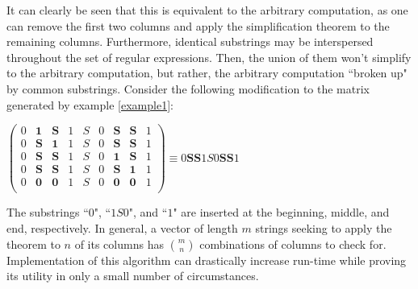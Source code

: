 \documentclass[runningheads]{llncs}
\begin{document}
It can clearly be seen that this is equivalent to the arbitrary computation, as one can remove the first two columns and apply the simplification theorem to the remaining columns.
Furthermore, identical substrings may be interspersed throughout the set of regular expressions. Then, the union of them won't simplify to the arbitrary computation, but rather, the arbitrary computation ``broken up" by common substrings. Consider the following modification to the matrix generated by example \ref{example1}:
\begin{center}
$
\begin{pmatrix}
  0 & \mathbf{1} & \mathbf{S} & 1 & S & 0 & \mathbf{S} & \mathbf{S} & 1\\
  0 & \mathbf{S} & \mathbf{1} & 1 & S & 0 & \mathbf{S} & \mathbf{S} & 1\\
  0 & \mathbf{S} & \mathbf{S} & 1 & S & 0 & \mathbf{1} & \mathbf{S} & 1\\
  0 & \mathbf{S} & \mathbf{S} & 1 & S & 0 & \mathbf{S} & \mathbf{1} & 1\\
  0 & \mathbf{0} & \mathbf{0} & 1 & S & 0 & \mathbf{0} & \mathbf{0} & 1\\
    \end{pmatrix} \equiv  0\mathbf{S}\mathbf{S}1S0  \mathbf{S}\mathbf{S}1
$
\end{center}
The substrings ``$0$", ``$1S0$", and ``$1$" are inserted at the beginning, middle, and end, respectively. In general, a vector of length $m$ strings seeking to apply the theorem to $n$ of its columns has $m \choose n$ combinations of columns to check for. Implementation of this algorithm can drastically increase run-time while proving its utility in only a small number of circumstances.
\end{document}

